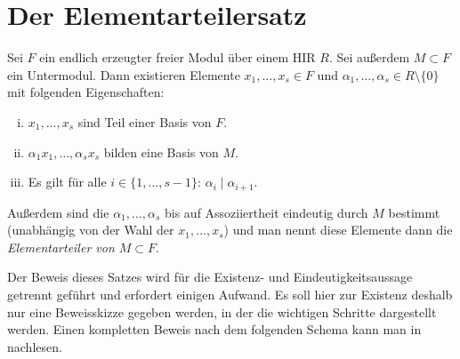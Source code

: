 
\chapter{Der Elementarteilersatz}
\begin{thSatz}[Elementarteilersatz]\label{ets}
    Sei $F$ ein endlich erzeugter freier Modul über einem HIR $R$. Sei außerdem
    $M\subset F$ ein Untermodul. Dann existieren Elemente $x_1,\ldots,x_s\in F$
    und $\alpha_1,\ldots,\alpha_s\in R\setminus\{0\}$ mit folgenden
    Eigenschaften:
    \begin{enumerate}[i)]
        \item
            $x_1,\ldots,x_s$ sind Teil einer Basis von $F$.
        \item
            $\alpha_1 x_1, \ldots, \alpha_s x_s$ bilden eine Basis von $M$.
        \item
            Es gilt für alle $i\in\{1,\ldots,s-1\}$:\; $\alpha_i\mid\alpha_{i+1}$.
    \end{enumerate}
    Außerdem sind die $\alpha_1,\ldots,\alpha_s$ bis auf Assoziiertheit
    eindeutig durch $M$ bestimmt (unabhängig von der Wahl der $x_1,\ldots,x_s$)
    und man nennt diese Elemente dann die \emph{Elementarteiler von 
    $M\subset F$}.
\end{thSatz}

Der Beweis dieses Satzes wird für die Existenz- und Eindeutigkeitsaussage
getrennt geführt und erfordert einigen Aufwand. Es soll hier zur Existenz
deshalb nur eine Beweisskizze gegeben werden, in der die wichtigen Schritte
dargestellt werden.  Einen kompletten Beweis nach dem folgenden Schema kann man
in \cite[S.\,210, Theorem~4~ff.]{bookc:bosch08} nachlesen.

